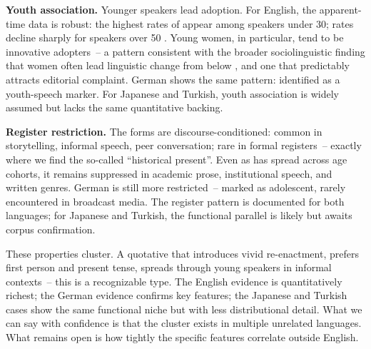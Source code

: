 \textbf{Youth association.} Younger speakers lead adoption. For English, the apparent-time data is robust: the highest rates of  appear among speakers under 30; rates decline sharply for speakers over 50 \autocite{tagliamontedarcy2004,tagliamontedarcy2007}. Young women, in particular, tend to be innovative adopters~-- a pattern consistent with the broader sociolinguistic finding that women often lead linguistic change from below \autocite{labov2001}, and one that predictably attracts editorial complaint. German shows the same pattern: \textcite{androutsopoulos1998} identified  as a youth-speech marker. For Japanese and Turkish, youth association is widely assumed but lacks the same quantitative backing.

\textbf{Register restriction.} The forms are discourse-conditioned: common in storytelling, informal speech, peer conversation; rare in formal registers~-- exactly where we find the so-called \enquote{historical present}. Even as  has spread across age cohorts, it remains suppressed in academic prose, institutional speech, and written genres. German  is still more restricted~-- marked as adolescent, rarely encountered in broadcast media. The register pattern is documented for both languages; for Japanese and Turkish, the functional parallel is likely but awaits corpus confirmation.

These properties cluster. A quotative that introduces vivid re-enactment, prefers first person and present tense, spreads through young speakers in informal contexts~-- this is a recognizable type. The English evidence is quantitatively richest; the German evidence confirms key features; the Japanese and Turkish cases show the same functional niche but with less distributional detail. What we can say with confidence is that the cluster exists in multiple unrelated languages. What remains open is how tightly the specific features correlate outside English.

